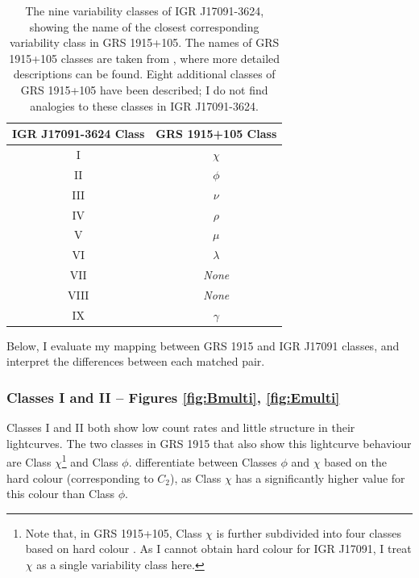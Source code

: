 \begin{table}
\centering
\caption[The nine variability classes of IGR J17091-3624, showing the name of the closest corresponding variability class in GRS 1915+105.]{The nine variability classes of IGR J17091-3624, showing the name of the closest corresponding variability class in GRS 1915+105.  The names of GRS 1915+105 classes are taken from \citet{Belloni_GRS_MI}, where more detailed descriptions can be found.  Eight additional classes of GRS 1915+105 have been described; I do not find analogies to these classes in IGR J17091-3624.}
\label{tab:class_assign}
\begin{tabular}{cc} %
\hline
\hline
IGR J17091-3624 Class & GRS 1915+105 Class\\
\hline
I&$\chi$\\
II&$\phi$\\
III&$\nu$\\
IV&$\rho$\\
V&$\mu$\\
VI&$\lambda$\\
VII&\textit{None}\\
VIII&\textit{None}\\
IX&$\gamma$\\
\hline
\hline
\end{tabular}
\end{table}

\par Below, I evaluate my mapping between GRS 1915 and IGR J17091 classes, and interpret the differences between each matched pair.

\subsubsection{Classes I and II -- Figures \ref{fig:Bmulti}, \ref{fig:Emulti}}

\label{sec:DisI}

\par Classes I and II both show low count rates and little structure in their lightcurves.  The two classes in GRS 1915 that also show this lightcurve behaviour are Class $\chi$\footnote{Note that, in GRS 1915+105, Class $\chi$ is further subdivided into four classes based on hard colour \citep{Belloni_GRS_MI,Pahari_Chi}.  As I cannot obtain hard colour for IGR J17091, I treat $\chi$ as a single variability class here.} and Class $\phi$.  \citealt{Belloni_GRS_MI} differentiate between Classes $\phi$ and $\chi$ based on the hard colour (corresponding to $C_2$), as Class $\chi$ has a significantly higher value for this colour than Class $\phi$.

